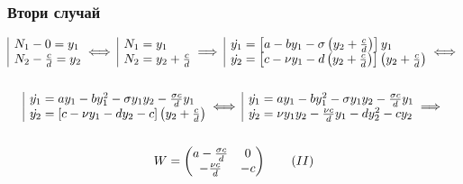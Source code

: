 \documentclass[a4paper,fleqn,12pt]{article}
\begin{document}
\subsubsection{Втори случай}
\begin{gather*}
	\begin{array}{|l@{}}
		 N_1 - 0 = y_1\\
		 N_2 - \frac{c}{d}= y_2
	\end{array} \iff 
	\begin{array}{|l@{}}
		 N_1 = y_1\\
		 N_2 = y_2 + \frac{c}{d}
	\end{array} \implies
	\begin{array}{|l@{}}
		\dot{y_1} = \left[a - by_1 - \sigma \left(y_2 + \frac{c}{d} \right) \right] y_1\\
		\dot{y_2} = \left[c - \nu y_1 - d \left(y_2 + \frac{c}{d} \right) \right] \left(y_2 + \frac{c}{d} \right) 
	\end{array} \iff \\ \\
	\begin{array}{|l@{}}
		\dot{y_1} = ay_1 - by_1 ^2- \sigma y_1 y_2 - \frac{\sigma c}{d} y_1\\
		\dot{y_2} = \left[c - \nu y_1 - dy_2 -c \right] \left(y_2 + \frac{c}{d} \right)  
	\end{array} \iff 
	\begin{array}{|l@{}}
		\dot{y_1} = ay_1 - by_1 ^2- \sigma y_1 y_2 - \frac{\sigma c}{d} y_1\\
		\dot{y_2} =\nu y_1 y_2 - \frac{\nu c}{d} y_1 - dy_2 ^2 - cy_2
	\end{array}
	\implies \\ \\ 
	W = \begin{pmatrix} a - \frac{\sigma c}{d}&0\\- \frac{\nu c}{d}& -c  \end{pmatrix} \tag{$II$}
\end{gather*}
\end{document}
